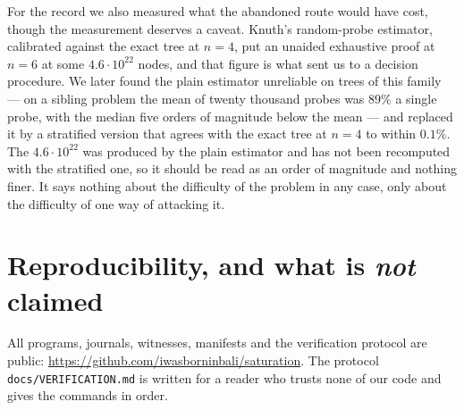\documentclass[11pt,a4paper]{article}
\begin{document}
For the record we also measured what the abandoned route would have cost, though the measurement deserves a
caveat.  Knuth's random-probe estimator, calibrated against the exact tree at $n=4$, put an unaided exhaustive
proof at $n=6$ at some $4.6\cdot10^{22}$ nodes, and that figure is what sent us to a decision procedure.  We
later found the plain estimator unreliable on trees of this family --- on a sibling problem the mean of twenty
thousand probes was $89\%$ a single probe, with the median five orders of magnitude below the mean --- and
replaced it by a stratified version that agrees with the exact tree at $n=4$ to within $0.1\%$.  The
$4.6\cdot10^{22}$ was produced by the plain estimator and has not been recomputed with the stratified one, so
it should be read as an order of magnitude and nothing finer.  It says nothing about the difficulty of the
problem in any case, only about the difficulty of one way of attacking it.

\section{Reproducibility, and what is \emph{not} claimed}
All programs, journals, witnesses, manifests and the verification protocol are public:
\url{https://github.com/iwasborninbali/saturation}.  The protocol \texttt{docs/VERIFICATION.md} is written for
a reader who trusts none of our code and gives the commands in order.
\end{document}
